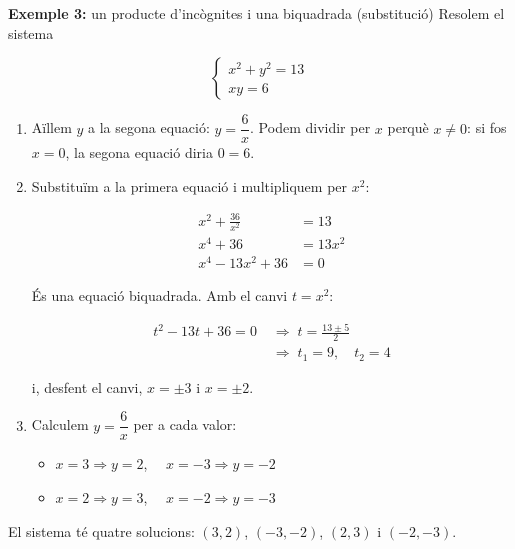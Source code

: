 \begin{exemple}{\textbf{Exemple 3:} un producte d'incògnites i una biquadrada (substitució)}
Resolem el sistema

\[
\begin{cases}
x^2+y^2=13\\
xy=6
\end{cases}
\]

\begin{enumerate}
\item Aïllem $y$ a la segona equació: $y=\dfrac{6}{x}$. Podem dividir per $x$ perquè $x\neq 0$: si fos $x=0$, la segona equació diria $0=6$.
\item Substituïm a la primera equació i multipliquem per $x^2$:

\[
\begin{aligned}
x^2+\frac{36}{x^2}&=13\\
x^4+36&=13x^2\\
x^4-13x^2+36&=0
\end{aligned}
\]

És una equació biquadrada. Amb el canvi $t=x^2$:

\[
\begin{aligned}t^2-13t+36=0 \;&\Rightarrow\; t=\frac{13\pm 5}{2}\\ &\Rightarrow\; t_1=9,\quad t_2=4\end{aligned}
\]

i, desfent el canvi, $x=\pm 3$ i $x=\pm 2$.
\item Calculem $y=\dfrac{6}{x}$ per a cada valor:

\begin{itemize}
\item $x=3 \Rightarrow y=2$, $\quad x=-3 \Rightarrow y=-2$
\item $x=2 \Rightarrow y=3$, $\quad x=-2 \Rightarrow y=-3$
\end{itemize}
\end{enumerate}

El sistema té quatre solucions: $(3,2)$, $(-3,-2)$, $(2,3)$ i $(-2,-3)$.
\end{exemple}

